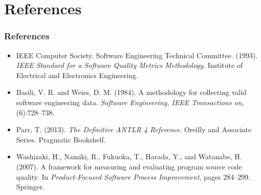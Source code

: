 \section{References}
\begin{frame}
\frametitle{References}

\begin{itemize}
  \item IEEE Computer Society. Software Engineering Technical Committee. (1993). \textit{IEEE Standard for a Software Quality Metrics Methodology}. Institute of Electrical and Electronics Engineering.
  \item Basili, V. R. and Weiss, D. M. (1984). A methodology for collecting valid software engineering data. \textit{Software Engineering, IEEE Transactions on}, (6):728–738.
  \item Parr, T. (2013). \textit{The Definitive ANTLR 4 Reference}. Oreilly and Associate Series. Pragmatic Bookshelf.
  \item Washizaki, H., Namiki, R., Fukuoka, T., Harada, Y., and Watanabe, H. (2007). A framework for measuring and evaluating program source code quality. In \textit{Product-Focused Software Process Improvement}, pages 284–299. Springer.

\end{itemize}

\end{frame}
